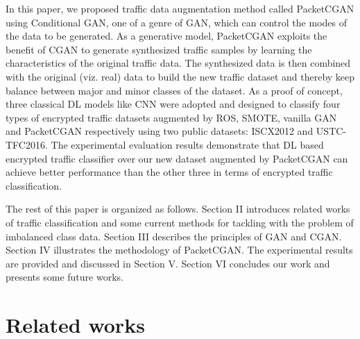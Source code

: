 \documentclass[conference]{IEEEtran}
\begin{document}
In this paper, we proposed traffic data augmentation method called PacketCGAN using Conditional GAN, one of a genre of GAN, which can control the modes of the data to be generated. As a generative model, PacketCGAN exploits the benefit of CGAN to generate synthesized traffic samples by learning the characteristics of the original traffic data. The synthesized data is then combined with the original (viz. real) data to build the new traffic dataset and thereby keep balance between major and minor classes of the dataset. As a proof of concept, three classical DL models like CNN were adopted and designed to classify four types of encrypted traffic datasets augmented by ROS, SMOTE, vanilla GAN and PacketCGAN respectively using two public datasets: ISCX2012 and USTC-TFC2016. The experimental evaluation results demonstrate that DL based encrypted traffic classifier over our new dataset augmented by  PacketCGAN can achieve better performance than the other three in terms of encrypted traffic classification.


The rest of this paper is organized as follows. Section II introduces related works of traffic classification and some current methods for tackling with the problem of imbalanced class data. Section III describes the principles of GAN and CGAN. Section IV illustrates the methodology of PacketCGAN. The experimental results are provided and discussed in Section V. Section VI  concludes our work and presents some future works.


\section{Related works}\label{sec:related_works}
\end{document}
